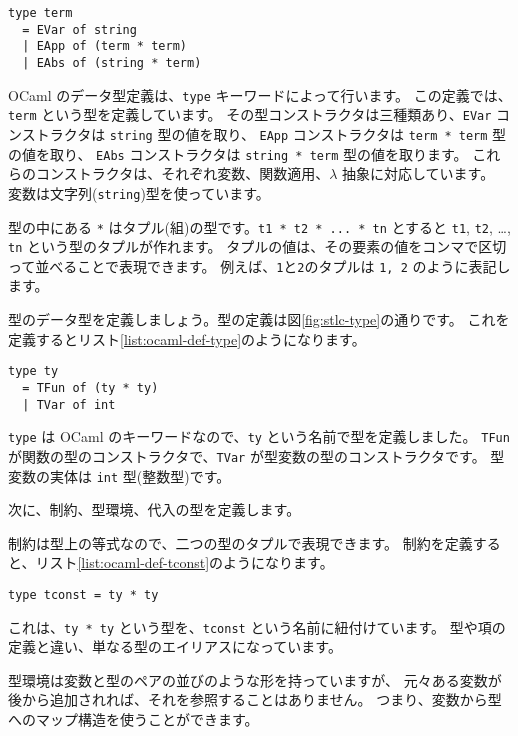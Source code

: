 \begin{lstlisting}[caption=項の定義, label=list:ocaml-def-term]
type term
  = EVar of string
  | EApp of (term * term)
  | EAbs of (string * term)
\end{lstlisting}

OCaml のデータ型定義は、\texttt{type} キーワードによって行います。
この定義では、\texttt{term} という型を定義しています。
その型コンストラクタは三種類あり、\texttt{EVar} コンストラクタは \texttt{string} 型の値を取り、
\texttt{EApp} コンストラクタは \texttt{term * term} 型の値を取り、
\texttt{EAbs} コンストラクタは \texttt{string * term} 型の値を取ります。
これらのコンストラクタは、それぞれ変数、関数適用、$\lambda$ 抽象に対応しています。
変数は文字列(\texttt{string})型を使っています。

型の中にある \texttt{*} はタプル(組)の型です。\texttt{t1 * t2 * ... * tn} とすると
\texttt{t1}, \texttt{t2}, \dots, \texttt{tn} という型のタプルが作れます。
タプルの値は、その要素の値をコンマで区切って並べることで表現できます。
例えば、\texttt{1}と\texttt{2}のタプルは \texttt{1, 2} のように表記します。

型のデータ型を定義しましょう。型の定義は図\ref{fig:stlc-type}の通りです。
これを定義するとリスト\ref{list:ocaml-def-type}のようになります。

\begin{lstlisting}[caption=型の定義, label=list:ocaml-def-type]
type ty
  = TFun of (ty * ty)
  | TVar of int
\end{lstlisting}

\texttt{type} は OCaml のキーワードなので、\texttt{ty} という名前で型を定義しました。
\texttt{TFun} が関数の型のコンストラクタで、\texttt{TVar} が型変数の型のコンストラクタです。
型変数の実体は \texttt{int} 型(整数型)です。

次に、制約、型環境、代入の型を定義します。

制約は型上の等式なので、二つの型のタプルで表現できます。
制約を定義すると、リスト\ref{list:ocaml-def-tconst}のようになります。

\begin{lstlisting}[caption=制約の定義, label=list:ocaml-def-tconst]
type tconst = ty * ty
\end{lstlisting}

これは、\texttt{ty * ty} という型を、\texttt{tconst} という名前に紐付けています。
型や項の定義と違い、単なる型のエイリアスになっています。

型環境は変数と型のペアの並びのような形を持っていますが、
元々ある変数が後から追加されれば、それを参照することはありません。
つまり、変数から型へのマップ構造を使うことができます。

